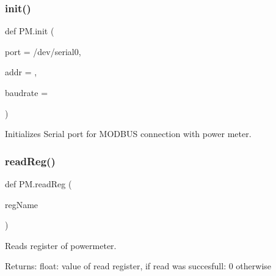 \subsubsection{\texorpdfstring{init()}{init()}}
{\footnotesize\ttfamily def P\+M.\+init (\begin{DoxyParamCaption}\item[{}]{port = {\ttfamily \textquotesingle{}/dev/serial0\textquotesingle{}},  }\item[{}]{addr = {},  }\item[{}]{baudrate = {} }\end{DoxyParamCaption})}

\begin{DoxyVerb}Initializes Serial port for MODBUS connection with power meter.
\end{DoxyVerb}
 \mbox{\label{namespacePM_a825d69d2e8f75daae4ef6359f77b7197}} 
\subsubsection{\texorpdfstring{read\+Reg()}{readReg()}}
{\footnotesize\ttfamily def P\+M.\+read\+Reg (\begin{DoxyParamCaption}\item[{}]{reg\+Name }\end{DoxyParamCaption})}

\begin{DoxyVerb}Reads register of powermeter.

Returns:
    float: value of read register, if read was succesfull: 0 otherwise
\end{DoxyVerb}
 